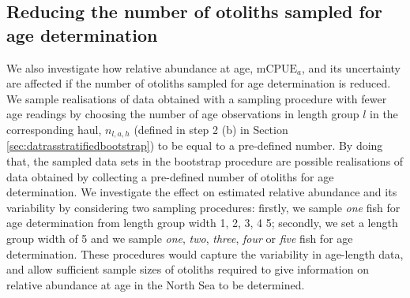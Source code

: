 \documentclass[a4paper 12pt]{article}
\numberwithin{equation}{section}
\newcommand{\ed}[1]{\textcolor{red}{#1}}
\begin{document}
\subsection{Reducing the number of otoliths sampled for age determination}
\label{sec:reducingeffort}
We also investigate how relative abundance at age, $\text{mCPUE}_a$, and its uncertainty are affected if the  number of otoliths sampled for age determination is reduced. We sample realisations of data obtained with a sampling procedure with fewer age readings by choosing the number of age observations in length group $l$ in the corresponding haul,  $n_{l,a,h}$ (defined in step 2 (b) in Section \ref{sec:datrasstratifiedbootstrap}) to be equal to a pre-defined number. By doing that, the sampled data sets in the bootstrap procedure are possible realisations of data obtained by collecting a pre-defined number of otoliths for age determination. We investigate the effect on estimated relative abundance and its variability by considering two sampling procedures: firstly,  we sample \textit{one} fish for age determination from length group width 1, 2, 3, 4 5; secondly, we set a length group width of 5 and we sample \textit{one}, \textit{two}, \textit{three}, \textit{four} or \textit{five} fish for age determination. These procedures would capture the variability in age-length data, and allow sufficient sample sizes of otoliths required to give information on relative abundance at age in the North Sea to be determined. 

\end{document}
